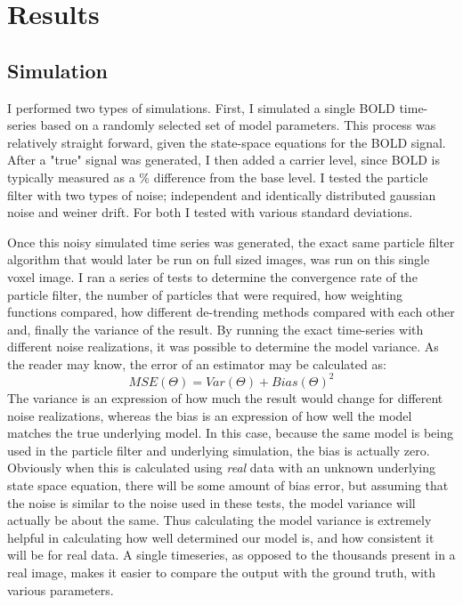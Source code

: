 \chapter{Results}

\section{Simulation}
I performed two types of simulations. First, I simulated a single BOLD time-series based
on a randomly selected set of model parameters. This process was relatively straight forward,
given the state-space equations for the BOLD signal. After a "true" signal was generated,
I then added a carrier level, since BOLD is typically measured as a \% difference from the
base level. I tested the particle filter with two types of noise; independent and identically
distributed gaussian noise and weiner drift. For both I tested with various standard deviations.

Once this noisy simulated time series was generated, the exact same particle filter algorithm
that would later be run on full sized images, was run on this single voxel image. I ran
a series of tests to determine the convergence rate of the particle filter, the number
of particles that were required, how weighting functions compared, how different de-trending
methods compared with each other and, finally the variance of the result. By running the exact
time-series with different noise realizations, it was possible to determine the model variance.
As the reader may know, the error of an estimator may be calculated as:
\begin{equation}
MSE(\Theta) = Var(\Theta) + Bias(\Theta)^2
\end{equation}
The variance is an expression of how much the result would change for different noise realizations,
whereas the bias is an expression of how well the model matches the true underlying model. In
this case, because the same model is being used in the particle filter and underlying simulation,
the bias is actually zero. Obviously when this is calculated using \emph{real} data with an unknown
underlying state space equation, there will be some amount of bias error, but assuming that the
noise is similar to the noise used in these tests, the model variance will actually be about the
same. Thus calculating the model variance is extremely helpful in calculating how well determined
our model is, and how consistent it will be for real data. A single timeseries, as opposed to the
thousands present in a real image, makes it easier to 
compare the output with the ground truth, with various parameters. 

